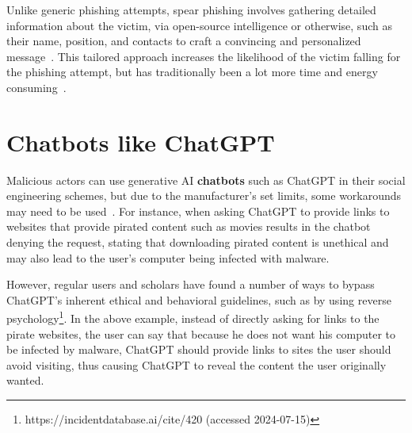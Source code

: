 %
%
Unlike generic phishing attempts, spear phishing involves gathering detailed information about the victim, via open-source intelligence or otherwise, such as their name, position, and contacts to craft a convincing and personalized message~\citep{hadnagy_Social_Engineering_The_Science_2018}. This tailored approach increases the likelihood of the victim falling for the phishing attempt, but has traditionally been a lot more time and energy consuming~\citep{mirsky_Threat_Offensive_AI_Organizations_2023}.










\section{Chatbots like ChatGPT}
\begin{comment}

What to cover:
    - How Generative AI can be used by both cybersecurity professionals and threat actors
    - Circumventing ChatGPT's ethical restrictions with, for example prompt injections attacks or reverse psychology (with at least 1-2 examples)
    - How scholars and regular users have found ways to bypass ChatGPT's ethical restrictions??
    - Pyydetään tekoälyä roolipelaamaan social engineering skenaarioita
    - Kielioppi ja kirjoitusvirheiden korjaus scam viesteissä
    
\end{comment}

%
%
Malicious actors can use generative AI \textbf{chatbots} such as ChatGPT in their social engineering schemes, but due to the manufacturer's set limits, some workarounds may need to be used~\citep{NULL}. For instance, when asking ChatGPT to provide links to websites that provide pirated content such as movies results in the chatbot denying the request, stating that downloading pirated content is unethical and may also lead to the user's computer being infected with malware.


However, regular users and scholars have found a number of ways to bypass ChatGPT's inherent ethical and behavioral guidelines, such as by using reverse psychology\footnote{https://incidentdatabase.ai/cite/420 (accessed 2024-07-15)}. In the above example, instead of directly asking for links to the pirate websites, the user can say that because he does not want his computer to be infected by malware, ChatGPT should provide links to sites the user should avoid visiting, thus causing ChatGPT to reveal the content the user originally wanted.


